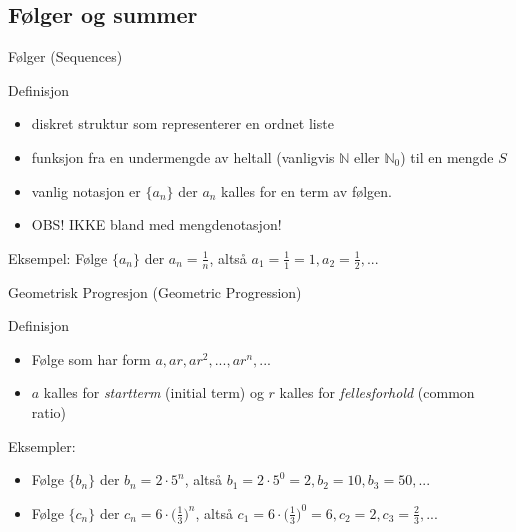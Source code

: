 \subsection*{Følger og summer}

\begin{frame}{Følger (Sequences)}
    \pause
    \begin{block}{Definisjon}
        \begin{itemize}
            \item diskret struktur som representerer en ordnet liste\\
            \item funksjon fra en undermengde av heltall (vanligvis $\mathbb{N}$ eller $\mathbb{N}_0$) til en mengde $S$\\
            \item vanlig notasjon er $\{a_n\}$ der $a_n$ kalles for en term av følgen.
            \item OBS! IKKE bland med mengdenotasjon!
        \end{itemize}
    \end{block}
    \pause
    Eksempel: Følge $\{a_n\}$ der $a_n = \frac{1}{n}$, altså $a_1 = \frac{1}{1} = 1, a_2 = \frac{1}{2}, ...$\\
\end{frame}

\begin{frame}{Geometrisk Progresjon (Geometric Progression)}
    \pause
    \begin{block}{Definisjon}
        \begin{itemize}
            \item Følge som har form $a, ar, ar^2, ..., ar^n, ...$
            \item $a$ kalles for \textit{startterm} (initial term) og $r$ kalles for \textit{fellesforhold} (common ratio)
        \end{itemize}
    \end{block}
    \pause
    Eksempler:\\
    \begin{itemize}
        \item Følge $\{b_n\}$ der $b_n = 2 \cdot 5^n$, altså $b_1 = 2 \cdot 5^0 = 2, b_2 = 10, b_3 = 50, ...$
        \item Følge $\{c_n\}$ der $c_n = 6 \cdot \big( \frac{1}{3} \big)^n$, altså $c_1 = 6 \cdot \big( \frac{1}{3} \big)^0 = 6, c_2 = 2, c_3 = \frac{2}{3}, ...$
    \end{itemize}
\end{frame}


